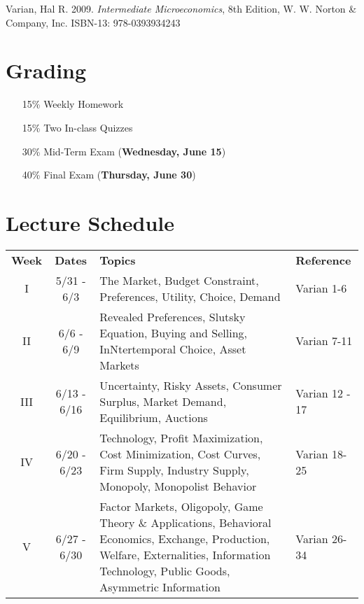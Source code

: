 \documentclass{article}
\begin{document}
Varian, Hal R. 2009. \textit{Intermediate Microeconomics}, 8th Edition, W. W. Norton \& Company, Inc. ISBN-13: 978-0393934243

\section*{Grading}

\begin{itemize}
\item [15\%] Weekly Homework
\item [15\%] Two In-class Quizzes
\item [30\%] Mid-Term Exam (\textbf{Wednesday, June 15})
\item [40\%] Final Exam (\textbf{Thursday, June 30})
\end{itemize}

\section*{Lecture Schedule}

\begin{table}[h]
\centering
\begin{tabular}{c c p{7cm} l}
\textbf{Week} & \textbf{Dates} & \textbf{Topics} & \textbf{Reference} \\
I & 5/31 - 6/3 & The Market, Budget Constraint, Preferences, Utility, Choice, Demand & Varian 1-6 \\
II & 6/6 - 6/9 & Revealed Preferences, Slutsky Equation, Buying and Selling, InNtertemporal Choice, Asset Markets & Varian 7-11 \\
III & 6/13 - 6/16 & Uncertainty, Risky Assets, Consumer Surplus, Market Demand, Equilibrium, Auctions & Varian 12 - 17 \\
IV & 6/20 - 6/23 & Technology, Profit Maximization, Cost Minimization, Cost Curves, Firm Supply, Industry Supply, Monopoly, Monopolist Behavior & Varian 18-25 \\ 
V & 6/27 - 6/30 & Factor Markets, Oligopoly, Game Theory \& Applications, Behavioral Economics, Exchange, Production, Welfare, Externalities, Information Technology, Public Goods, Asymmetric Information & Varian 26-34 \\
\end{tabular}
\end{table}
\end{document}
